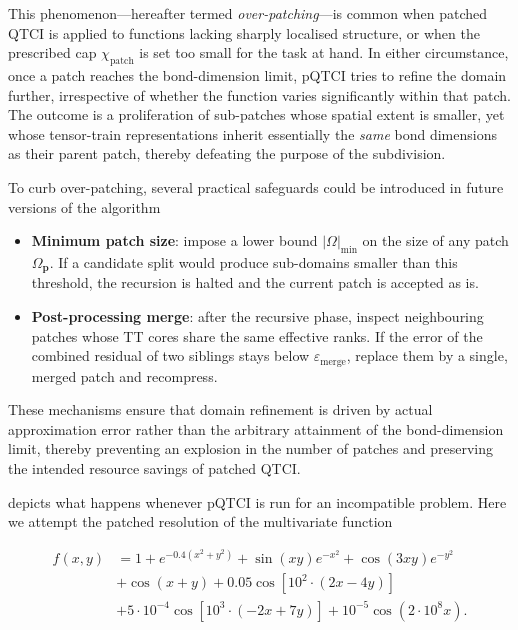 This phenomenon—hereafter termed \emph{over-patching}—is common when patched QTCI is applied to functions lacking sharply localised structure, or when the prescribed cap $\chi_{\text{patch}}$ is set too small for the task at hand.  
In either circumstance, once a patch reaches the bond-dimension limit, pQTCI tries to refine the domain further, irrespective of whether the function varies significantly within that patch.  
The outcome is a proliferation of sub-patches whose spatial extent is smaller, yet whose tensor-train representations inherit essentially the \emph{same} bond dimensions as their parent patch, thereby defeating the purpose of the subdivision.

To curb over-patching, several practical safeguards could be introduced in future versions of the algorithm
%
\begin{itemize}
  	\item \textbf{Minimum patch size}: impose a lower bound $|\Omega|_{\min}$ on the  size of any patch $\Omega_{\mathbf p}$. If a candidate split would produce sub-domains smaller than this threshold, the recursion is halted and the current patch is accepted as is.
  \item \textbf{Post-processing merge}: after the recursive phase, inspect neighbouring patches whose TT cores share the same effective ranks.  If the error of the combined residual of two siblings stays below $\varepsilon_{\text{merge}}$, replace them by a single, merged patch and recompress.
\end{itemize}

These mechanisms ensure that domain refinement is driven by actual approximation error rather than the arbitrary attainment of the bond-dimension limit, thereby preventing an explosion in the number of patches and preserving the intended resource savings of patched QTCI.

 depicts what happens whenever pQTCI is run for an incompatible problem. Here we attempt the patched resolution of the multivariate function 

\begin{align}
\label{eq:2Dfunction}
   \nonumber f(x,y) &=
  1+e^{-0.4 \left( x^{2} + y^{2} \right)}
  + \sin \left( x y \right)  e^{-x^{2}} 
  + \cos \left( 3 x y \right) e^{-y^{2}}\\
  &+ \cos \left( x + y \right) 
  + 0.05 \cos \left[ 10^2 \cdot \left( 2 x - 4 y \right) \right]\\ 
  \nonumber &+ 5 \cdot 10^{-4} \cos \left[ 10^{3} \cdot \left( -2 x + 7 y \right) \right]
  + 10^{-5} \cos \left( 2\cdot 10^{8} x \right) .
\end{align}

